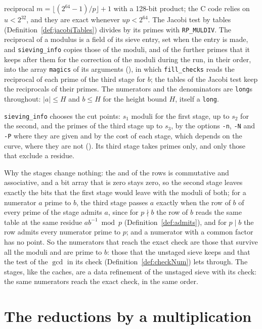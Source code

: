 reciprocal $m = \lfloor (2^{64} - 1) / p \rfloor + 1$ with a 128-bit product; the C code relies on
$u < 2^{32}$, and they are exact whenever $u p < 2^{64}$. The Jacobi test by tables
(Definition~\ref{def:jacobiTables}) divides by its primes with \verb|RP_MULDIV|. The reciprocal of a
modulus is a field of its sieve entry, set when the entry is made, and \verb|sieving_info| copies
those of the moduli, and of the further primes that it keeps after them for the correction of the
moduli during the run, in their order, into the array \verb|magics| of its arguments
(), in which \verb|fill_checks| reads the reciprocal of each
prime of the third stage for $b$; the tables of the Jacobi test keep the reciprocals of their
primes. The numerators and the denominators are \verb|long|s throughout: $|a| \le H$ and $b \le H$
for the height bound $H$, itself a \verb|long|.

\verb|sieving_info| chooses the cut points: $s_1$ moduli for the first stage, up to $s_2$ for the
second, and the primes of the third stage up to $s_3$, by the options \verb|-n|, \verb|-N| and
\verb|-P| where they are given and by the cost of each stage, which depends on the curve, where they
are not (). Its third stage takes primes only, and only those
that exclude a residue.

Why the stages change nothing: the and of the rows is commutative and associative, and a bit array
that is zero stays zero, so the second stage leaves exactly the bits that the first stage would
leave with the moduli of both; for a numerator $a$ prime to $b$, the third stage passes $a$ exactly
when the row of $b$ of every prime of the stage admits $a$, since for $p \nmid b$ the row of $b$
reads the same table at the same residue $a b^{-1} \bmod p$ (Definition~\ref{def:admits}), and for
$p \mid b$ the row admits every numerator prime to $p$; and a numerator with a common factor has no
point. So the numerators that reach the exact check are those that survive all the moduli and are
prime to $b$: those that the unstaged sieve keeps and that the test of the $\gcd$ in its check
(Definition~\ref{def:checkNum}) lets through. The stages, like the caches, are a data refinement of
the unstaged sieve with its check: the same numerators reach the exact check, in the same order.

\section{The reductions by a multiplication}\label{sec:mulMod}

